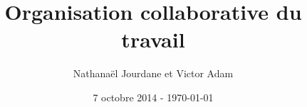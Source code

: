 \documentclass[a4paper,12pt,twoside]{report}
\title{Organisation collaborative du travail}
\author{Nathanaël Jourdane et Victor Adam}
\date{7 octobre 2014 - \today}
\begin{document}
\maketitle
\newpage \tableofcontents







\printglossaries

\appendix

\end{document}
